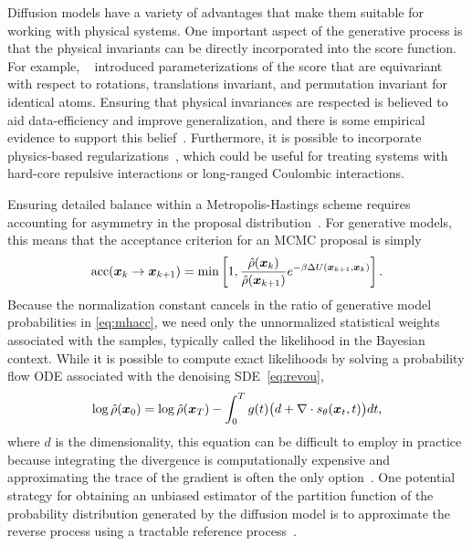 \documentclass[11pt]{article}
\begin{document}
Diffusion models have a variety of advantages that make them suitable for working with physical systems. 
One important aspect of the generative process is that the physical invariants can be directly incorporated into the score function.
For example, ~\cite{schneuing_structure-based_2022,weiss_guided_2023} introduced parameterizations of the score that are equivariant with respect to rotations, translations invariant, and permutation invariant for identical atoms.
Ensuring that physical invariances are respected is believed to aid data-efficiency and improve generalization, and there is some empirical evidence to support this belief~\cite{sannai_improved_2021}.
Furthermore, it is possible to incorporate physics-based regularizations~\cite{zheng_towards_2023}, which could be useful for treating systems with hard-core repulsive interactions or long-ranged Coulombic interactions.

Ensuring detailed balance within a Metropolis-Hastings scheme requires accounting for asymmetry in the proposal distribution~\cite{frenkel_understanding_2002}.
For generative models, this means that the acceptance criterion for an MCMC proposal is simply
\begin{equation}
    \textrm{acc}(\boldsymbol{x}_{k} \to \boldsymbol{x}_{k+1}) = \min \left[ 1, \frac{\hat{\rho}(\boldsymbol{x}_{k})}{\hat{\rho}(\boldsymbol{x}_{k+1})} e^{-\beta \Delta U(\boldsymbol{x}_{k+1},\boldsymbol{x}_k)} \right].
    \label{eq:mhacc}
\end{equation}
Because the normalization constant cancels in the ratio of generative model probabilities in \eqref{eq:mhacc}, we need only the unnormalized statistical weights associated with the samples, typically called the likelihood in the Bayesian context.
While it is possible to compute exact likelihoods by solving a probability flow ODE associated with the denoising SDE~\eqref{eq:revou}, 
\begin{equation}
    \log \hat\rho(\boldsymbol{x}_0) = \log \hat\rho(\boldsymbol{x}_T) - \int_0^T g(t) \bigl( d + \nabla \cdot s_{\theta}(\boldsymbol{x}_t,t) \bigr) dt,
    \label{eq:pfode}
\end{equation}
where $d$ is the dimensionality, this equation can be difficult to employ in practice because integrating the divergence is computationally expensive and approximating the trace of the gradient is often the only option~\cite{grathwohl_ffjord_2018}.
One potential strategy for obtaining an unbiased estimator of the partition function of the probability distribution generated by the diffusion model is to approximate the reverse process using a tractable reference process~\cite{vargas_denoising_2023}.
\end{document}
